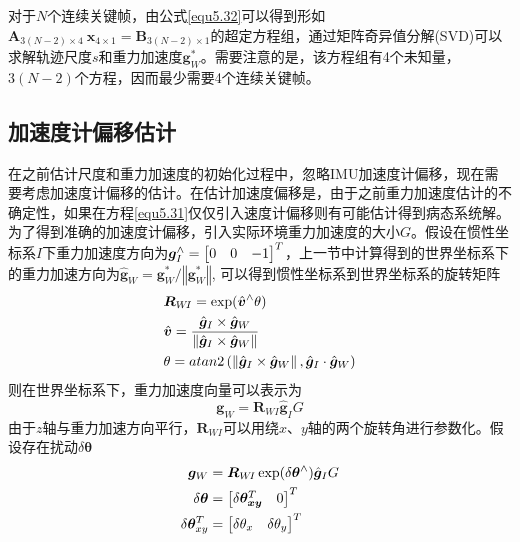 对于$N$个连续关键帧，由公式\eqref{equ5.32}可以得到形如$\boldsymbol{A}_{3(N-2)\times4} \  \boldsymbol{x}_{4\times 1} = \boldsymbol{B}_{3(N-2)\times 1}$的超定方程组，通过矩阵奇异值分解(SVD)可以求解轨迹尺度$s$和重力加速度$\boldsymbol{g}_W^*$。需要注意的是，该方程组有4个未知量，$3(N-2)$个方程，因而最少需要4个连续关键帧。


\subsection{加速度计偏移估计}
在之前估计尺度和重力加速度的初始化过程中，忽略IMU加速度计偏移，现在需要考虑加速度计偏移的估计。在估计加速度偏移是，由于之前重力加速度估计的不确定性，如果在方程\eqref{equ5.31}仅仅引入速度计偏移则有可能估计得到病态系统解。为了得到准确的加速度计偏移，引入实际环境重力加速度的大小$G$。假设在惯性坐标系$I$下重力加速度方向为$\boldsymbol{g}_I^{\wedge}= { \begin{bmatrix} 0 & 0 & -1 \cr  \end{bmatrix} ^T }$，上一节中计算得到的世界坐标系下的重力加速方向为$\hat{\boldsymbol{g}}_W = \boldsymbol{g}_W^* / \left\Vert \boldsymbol{g}_W^* \right\Vert$, 可以得到惯性坐标系到世界坐标系的旋转矩阵
\begin{equation}
\label{equ5.33}
\begin{aligned}
& \boldsymbol{R}_{W\!I} = \exp(\hat{\boldsymbol{v}}^{\wedge}\theta)  \\ 
& \hat{\boldsymbol{v}} = { { \hat{\boldsymbol{g}}_I \times \hat{\boldsymbol{g}}_W } \over { \left\Vert \hat{\boldsymbol{g}}_I \times \hat{\boldsymbol{g}}_W   \right\Vert } }\\ 
& \theta = atan2\left( \left\Vert \hat{\boldsymbol{g}}_I \times \hat{\boldsymbol{g}}_W   \right\Vert, \hat{\boldsymbol{g}}_I \cdot \hat{\boldsymbol{g}}_W \right)
\end{aligned}
\end{equation}
则在世界坐标系下，重力加速度向量可以表示为
\begin{equation}
\label{equ5.34}
\boldsymbol{g}_W = \boldsymbol{R}_{W\!I}\hat{\boldsymbol{g}}_IG
\end{equation}
由于$z$轴与重力加速方向平行，$\boldsymbol{R}_{W\!I}$可以用绕$x$、$y$轴的两个旋转角进行参数化。假设存在扰动$\delta \boldsymbol{\theta}$
\begin{equation}
\label{equ5.35}
\begin{aligned}
\boldsymbol{g}_W & = \boldsymbol{R}_{W\!I} \exp (\delta \boldsymbol{\theta}^{\wedge}) \hat{\boldsymbol{g}}_I G 
\\ 
\delta \boldsymbol{\theta} &=
\begin{bmatrix}
\delta \boldsymbol{\theta_{xy}}^T & 0 \cr
\end{bmatrix}^T
\\
\delta \boldsymbol{\theta}_{xy}^T &= 
\begin{bmatrix}
\delta \theta_x & \delta \theta_y \cr
\end{bmatrix}^T
\end{aligned}
\end{equation}
